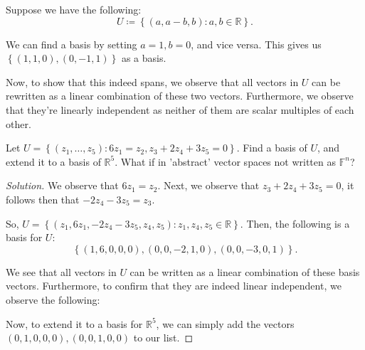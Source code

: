 \documentclass[openany]{book}
\newenvironment{solution}{\begin{proof}[Solution]}{\end{proof}}
\newcommand{\RR}{\mathbb{R}}
\begin{document}
\begin{example}
	Suppose we have the following:
	\begin{equation*}
		U \coloneq \left\{  (a, a-b, b) : a, b \in \RR \right\}.
	\end{equation*}

	We can find a basis by setting $a = 1, b = 0$, and vice versa. This gives us $\left\{  (1,1,0), (0,-1,1) \right\}$ as a basis.
	
	Now, to show that this indeed spans, we observe that all vectors in $U$ can be rewritten as a linear combination of these two vectors. Furthermore, we observe that they're linearly independent as neither of them are scalar multiples of each other.
	
	
\end{example}

\begin{hw}
	Let $U = \left\{  (z_{1}, \ldots, z_{5}) : 6z_{1} = z_{2}, z_{3} + 2z_{4} + 3z_{5} = 0 \right\}$. Find a basis of $U$, and extend it to a basis of $\RR^{5}$. What if in 'abstract' vector spaces not written as $\mathbb{F}^{n}$?
\end{hw}
\begin{solution}
	We observe that $6z_{1} = z_{2}$. Next, we observe that $z_{3} + 2z_{4} + 3z_{5} = 0$, it follows then that $-2z_{4} - 3z_{5} = z_{3}$.
	
	So, $U = \left\{  (z_{1}, 6z_{1}, -2z_{4} - 3z_{5}, z_{4}, z_{5}) : z_{1}, z_{4}, z_{5} \in \RR \right\}$. Then, the following is a basis for $U$:
	\begin{equation*}
		\left\{  (1,6,0,0,0), (0,0,-2,1,0), (0,0,-3,0,1) \right\}.
	\end{equation*}

	We see that all vectors in $U$ can be written as a linear combination of these basis vectors. Furthermore, to confirm that they are indeed linear independent, we observe the following:
	
	Now, to extend it to a basis for $\RR^{5}$, we can simply add the vectors $(0,1,0,0,0), (0,0,1,0,0)$ to our list.
\end{solution}
\end{document}
